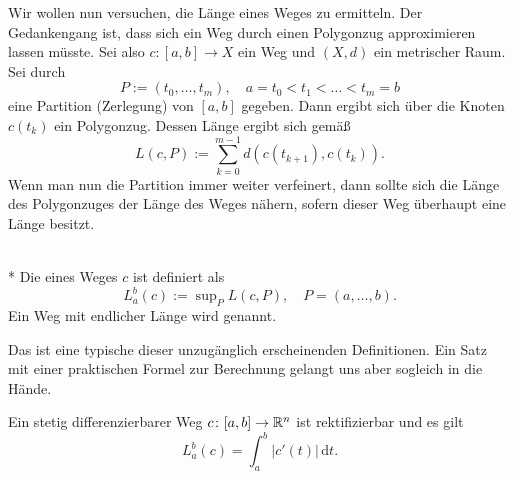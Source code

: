Wir wollen nun versuchen, die Länge eines Weges zu ermitteln.
Der Gedankengang ist, dass sich ein Weg durch einen Polygonzug
approximieren lassen müsste. Sei also $c\colon [a,b]\to X$
ein Weg und $(X,d)$ ein metrischer Raum. Sei durch%
\begin{equation}
P:=(t_0,\ldots,t_m),\quad a=t_0<t_1<\ldots <t_m=b
\end{equation}
eine Partition (Zerlegung) von $[a,b]$ gegeben. Dann ergibt sich
über die Knoten $c(t_k)$ ein Polygonzug. Dessen Länge ergibt
sich gemäß%
\begin{equation}
L(c,P) := \sum_{k=0}^{m-1} d(c(t_{k+1}),c(t_k)).
\end{equation}
Wenn man nun die Partition immer weiter verfeinert, dann sollte
sich die Länge des Polygonzuges der Länge des Weges nähern, sofern
dieser Weg überhaupt eine Länge besitzt.
\begin{definition}\mbox{}\\*
Die  eines Weges $c$ ist definiert als%
\begin{equation}
L_a^b(c) := \sup\nolimits_P L(c,P), \quad P=(a,\ldots,b).
\end{equation}
Ein Weg mit endlicher Länge wird  genannt.
\end{definition}
Das ist eine typische dieser unzugänglich erscheinenden Definitionen.
Ein Satz mit einer praktischen Formel zur Berechnung gelangt uns
aber sogleich in die Hände.
\begin{theorem}
Ein stetig differenzierbarer Weg $c\colon [a,b]\to\mathbb R^n$ ist
rektifizierbar und es gilt%
\begin{equation}\label{eq:Laenge}
L_a^b(c) = \int_a^b |c'(t)|\,\mathrm dt.
\end{equation}
\end{theorem}

